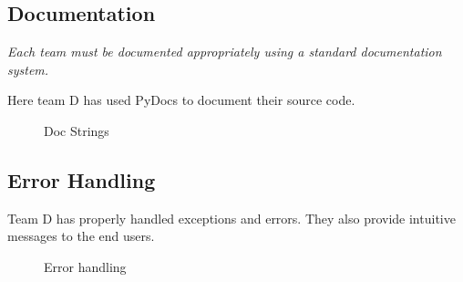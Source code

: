 \subsection{Documentation}
\begin{flushleft}
  \textit{Each team must be documented appropriately using a standard documentation system.}\newline

    Here team D has used PyDocs to document their source code.
  
  
    \begin{figure}[h!]
        \centering
        \vspace{.5cm}
        \caption{Doc Strings}
        \label{fig:docstrings }
    \end{figure}
\end{flushleft}
\subsection{Error Handling}
\begin{flushleft}
    Team D has properly handled exceptions and errors. They also provide intuitive messages to the end users.
    \begin{figure}[h!]
        \centering
        \vspace{.5cm}
        \caption{Error handling}
        \label{fig:errpr handelling }
    \end{figure}
\end{flushleft}
